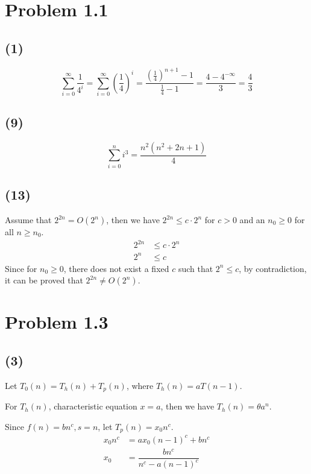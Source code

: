 \documentclass[12pt]{article}
\begin{document}
\section*{Problem 1.1}

\subsection*{(1)}
\[
  \sum_{i = 0} ^{\infty} \dfrac{1}{4^i} = \sum_{i = 0} ^{\infty} (\dfrac{1}{4})^i = \dfrac{(\frac{1}{4})^{n+1} - 1}{\frac{1}{4} - 1} = \dfrac{4 - 4^{-\infty}}{3} = \dfrac{4}{3}
\]

\subsection*{(9)}
\[
  \sum_{i = 0}^n i^3 = \dfrac{n^{2} (n^{2} + 2 n + 1)}{4}
\]

\subsection*{(13)}
Assume that \(2^{2n} = O(2^n)\), then we have \(2^{2n} \leq c \cdot 2^n\) for \(c > 0\) and an \(n_0 \geq 0\) for all \(n \geq n_0\). 
\[
  \begin{aligned}
    2^{2n} &\leq c \cdot 2^n \\
    2^{n} &\leq c
  \end{aligned}
\]
Since for \(n_0 \geq 0\), there does not exist a fixed \(c\) such that \(2^n \leq c\), by contradiction, it can be proved that \(2^{2n} \neq O(2^n)\).

\section*{Problem 1.3}

\subsection*{(3)}
Let \(T_0(n) = T_h(n) + T_p(n)\), where \(T_h(n) = aT(n - 1)\). 

For \(T_h(n)\), characteristic equation \(x = a\), then we have \(T_h(n) = \theta a^n\). 

Since \(f(n) = bn^c, s = n\), let \(T_p(n) = x_0 n^c \). 
\[
  \begin{aligned}
    x_0 n^c &= ax_0 (n - 1)^c + bn^c \\
    x_0 &= \dfrac{bn^c}{n^c - a(n - 1)^c}
  \end{aligned}
\]
\end{document}
